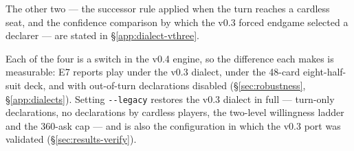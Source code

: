 The other two --- the successor rule applied when the turn reaches a cardless
seat, and the confidence comparison by which the v0.3 forced endgame selected a
declarer --- are stated in \S\ref{app:dialect-vthree}.

Each of the four is a switch in the v0.4 engine, so the difference each makes is
measurable: E7 reports play under the v0.3 dialect, under the 48-card
eight-half-suit deck, and with out-of-turn declarations disabled
(\S\ref{sec:robustness}, \S\ref{app:dialects}). Setting \texttt{-{}-legacy}
restores the v0.3 dialect in full --- turn-only declarations, no declarations by
cardless players, the two-level willingness ladder and the 360-ask cap --- and
is also the configuration in which the v0.3 port was validated
(\S\ref{sec:results-verify}).
